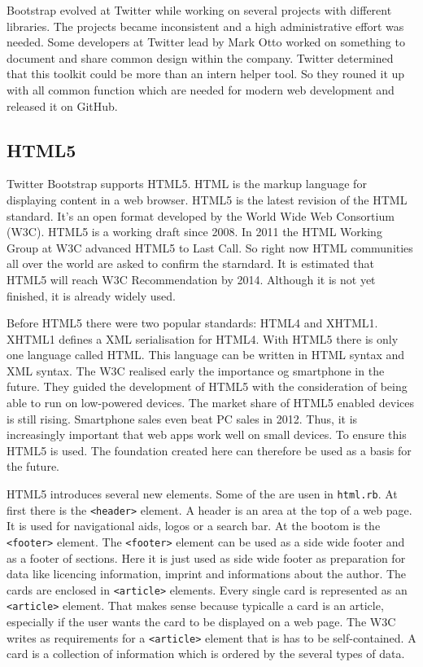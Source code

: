 Bootstrap evolved at Twitter while working on several projects with different libraries. The projects became inconsistent and a high administrative effort was needed. Some developers at Twitter lead by Mark Otto worked on something to document and share common design within the company. Twitter determined that this toolkit could be more than an intern helper tool. So they rouned it up with all common function which are needed for modern web development and released it on GitHub. \cite{markotto}

\subsection{HTML5}
Twitter Bootstrap supports HTML5. HTML is the markup language for displaying content in a web browser. HTML5 is the latest revision of the HTML standard. It's an open format developed by the World Wide Web Consortium (W3C). HTML5 is a working draft since 2008. In 2011 the HTML Working Group at W3C advanced HTML5 to Last Call. So right now HTML communities all over the world are asked to confirm the starndard.  It is estimated that HTML5 will reach W3C Recommendation by 2014.\cite{html:lastcall} Although it is not yet finished, it is already widely used.

Before HTML5  there were two popular standards: HTML4 and XHTML1. XHTML1 defines a XML serialisation for HTML4. With HTML5 there is only one language called HTML. This language can be written in HTML syntax and XML syntax. 
\cite{html:5differences} The W3C realised early the importance og smartphone in the future. They guided the development of HTML5 with the consideration of being able to run on low-powered devices. The market share of HTML5 enabled devices is still rising. \cite{smartphonesales} Smartphone sales even beat PC sales in 2012. Thus, it is increasingly important that web apps work well on small devices. To ensure this HTML5 is used. The foundation created here can therefore be used as a basis for the future.

HTML5 introduces several new elements. Some of the are usen in \texttt{html.rb}. At first there is the \lstinline{<header>} element. A header is an area at the top of a web page. It is used for navigational aids, logos or a search bar. \cite{html5:header} At the bootom is the \lstinline{<footer>} element. The \lstinline{<footer>} element can be used as a side wide footer and as a footer of sections. \cite{html5:footer} Here it is just used as side wide footer as preparation for data like licencing information, imprint and informations about the author. The cards are enclosed in \lstinline{<article>} elements. Every single card is represented as an \lstinline{<article>} element. That makes sense because typicalle a card is an article, especially if the user wants the card to be displayed on a web page. The W3C writes as requirements for a \lstinline{<article>} element that is has to be self-contained. \cite{html5:article} A card is a collection of information which is ordered by the several types of data. 

